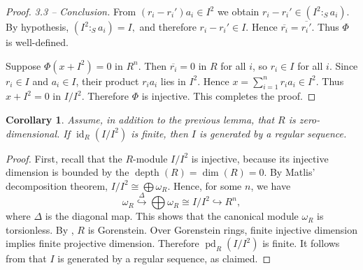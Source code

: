 \documentclass[10. pt,a4paper]{amsart}
\newtheorem{corollary}[theorem]{Corollary}
\theoremstyle{definition}
\theoremstyle{remark}
\newcommand{\id}{\operatorname{id}}
\newcommand{\pd}{\operatorname{pd}}
\newcommand{\depth}{\operatorname{depth}}
\begin{document}
\begin{proof}
\noindent\textit{3.3 -- Conclusion.}
From
$
(r_i-r_i')a_i\in I^2
$ we obtain
$r_i-r_i'
\in
(I^2:_S a_i).
$ By hypothesis,
$
(I^2:_S a_i)=I,
$
and therefore
$
r_i-r_i'\in I.
$ Hence
$
\overline{r_i}
=
\overline{r_i'}.
$  Thus \(\Phi\) is well-defined.
	
Suppose $\Phi(x + I^2) = 0$ in $R^n$. Then $\overline{r_i} = 0$ in $R$ for all $i$, so $r_i \in I$ for all $i$.
	Since $r_i \in I$ and $a_i \in I$, their product $r_i a_i$ lies in $I^2$. Hence
	\(
	x = \sum_{i=1}^n r_i a_i \in I^2.
	\)
	Thus $x + I^2 = 0$ in $I/I^2$. Therefore $\Phi$ is injective.
This completes the proof.
\end{proof}
	 


\begin{corollary}\label{zer}
	Assume, in addition to the previous lemma, that $R$ is zero-dimensional. If $\id_R(I/I^2)$ is finite, then $I$ is generated by a regular sequence.
\end{corollary}

\begin{proof}
	First, recall that the $R$-module $I/I^2$ is injective, because its injective dimension is bounded by the $\depth(R)=\dim(R)=0$. By Matlis' decomposition theorem, $I/I^2 \cong \bigoplus \omega_R$.  Hence, for some $n$, we have
	\[
	\omega_R \stackrel{\Delta}{\hookrightarrow} \bigoplus \omega_R \cong I/I^2 \hookrightarrow R^n,
	\]
	where $\Delta$ is the diagonal map. This shows that the canonical module $\omega_R$ is torsionless. By  \cite[3.7]{moh2}, $R$ is Gorenstein. Over Gorenstein rings, finite injective dimension implies finite projective dimension. Therefore $\pd_R(I/I^2)$ is finite. It follows from \cite{v} that $I$ is generated by a regular sequence, as claimed.
\end{proof}
\end{document}
